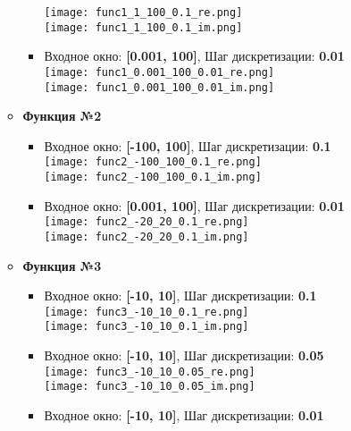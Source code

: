 \documentclass[11pt]{article}
\begin{document}
\begin{itemize}
\begin{itemize}
\begin{itemize}
					\texttt{[image: func1\_1\_100\_0.1\_re.png]}\\
					\texttt{[image: func1\_1\_100\_0.1\_im.png]}\\
				\item Входное окно: \textbf{[0.001, 100]}, Шаг дискретизации: \textbf{0.01} \medskip \\
					\texttt{[image: func1\_0.001\_100\_0.01\_re.png]}\\
					\texttt{[image: func1\_0.001\_100\_0.01\_im.png]}\\
			\end{itemize}
		\item \textbf{Функция №2}	
			\begin{itemize}
				\item Входное окно: \textbf{[-100, 100]}, Шаг дискретизации: \textbf{0.1} \medskip \\
					\texttt{[image: func2\_-100\_100\_0.1\_re.png]}\\
					\texttt{[image: func2\_-100\_100\_0.1\_im.png]}\\
				\item Входное окно: \textbf{[0.001, 100]}, Шаг дискретизации: \textbf{0.01} \medskip \\
					\texttt{[image: func2\_-20\_20\_0.1\_re.png]}\\
					\texttt{[image: func2\_-20\_20\_0.1\_im.png]}\\
			\end{itemize}
		\item \textbf{Функция №3}
			\begin{itemize}	
				\item Входное окно: \textbf{[-10, 10]}, Шаг дискретизации: \textbf{0.1} \medskip \\
					\texttt{[image: func3\_-10\_10\_0.1\_re.png]}\\
					\texttt{[image: func3\_-10\_10\_0.1\_im.png]}\\
				\item Входное окно: \textbf{[-10, 10]}, Шаг дискретизации: \textbf{0.05} \medskip \\
					\texttt{[image: func3\_-10\_10\_0.05\_re.png]}\\
					\texttt{[image: func3\_-10\_10\_0.05\_im.png]}\\
					\newpage
				\item Входное окно: \textbf{[-10, 10]}, Шаг дискретизации: \textbf{0.01} \medskip \\

\end{itemize}
\end{itemize}
\end{itemize}
\end{document}
